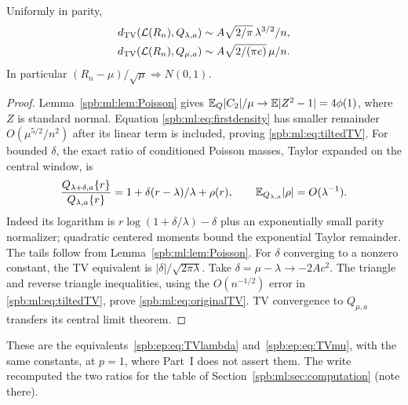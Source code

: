 \begin{corollary}\label{spb:ml:cor:Poisson}
Uniformly in parity,
\begin{align}
 d_{\mathrm{TV}}(\mathcal L(R_n),Q_{\lambda,a})&\sim
       A\sqrt{2/\pi}\,\lambda^{3/2}/n,\label{spb:ml:eq:originalTV}\\
 d_{\mathrm{TV}}(\mathcal L(R_n),Q_{\mu,a})&\sim
       A\sqrt{2/(\pi e)}\,\mu/n.\label{spb:ml:eq:tiltedTV}
\end{align}
In particular $(R_n-\mu)/\sqrt\mu\Longrightarrow N(0,1)$.
\end{corollary}
\begin{proof}
Lemma~\ref{spb:ml:lem:Poisson} gives $\mathbb E_Q|C_2|/\mu\to\mathbb E|Z^2-1|=4\phi(1)$, where $Z$ is standard normal. Equation \eqref{spb:ml:eq:firstdensity} has smaller remainder $O(\mu^{5/2}/n^2)$ after its linear term is included, proving \eqref{spb:ml:eq:tiltedTV}. For bounded $\delta$, the exact ratio of conditioned Poisson masses, Taylor expanded on the central window, is
\[
 \frac{Q_{\lambda+\delta,a}\{r\}}{Q_{\lambda,a}\{r\}}
 =1+\delta(r-\lambda)/\lambda+\rho(r),\qquad
 \mathbb E_{Q_{\lambda,a}}|\rho|=O(\lambda^{-1}).
\]
Indeed its logarithm is $r\log(1+\delta/\lambda)-\delta$ plus an exponentially small parity normalizer; quadratic centered moments bound the exponential Taylor remainder. The tails follow from Lemma~\ref{spb:ml:lem:Poisson}. For $\delta$ converging to a nonzero constant, the TV equivalent is $|\delta|/\sqrt{2\pi\lambda}$. Take $\delta=\mu-\lambda\to-2Ac^2$. The triangle and reverse triangle inequalities, using the $O(n^{-1/2})$ error in \eqref{spb:ml:eq:tiltedTV}, prove \eqref{spb:ml:eq:originalTV}. TV convergence to $Q_{\mu,a}$ transfers its central limit theorem.
\end{proof}
\begin{writenote}[7 October 2026]
These are the equivalents~\eqref{spb:ep:eq:TVlambda}
and~\eqref{spb:ep:eq:TVmu}, with the same constants, at $p=1$, where Part~I
does not assert them. The write recomputed the two ratios for the table of
Section~\ref{spb:ml:sec:computation} (note there).
\end{writenote}

